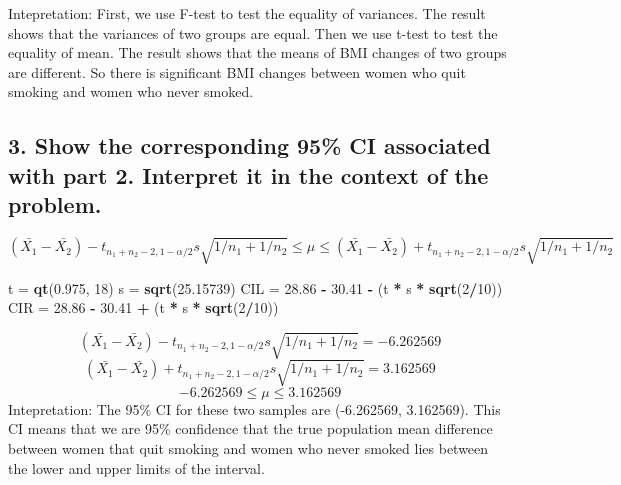 \documentclass[]{article}
\newenvironment{Shaded}{\begin{snugshade}}{\end{snugshade}}
\newcommand{\KeywordTok}[1]{\textcolor[rgb]{0.13,0.29,0.53}{\textbf{#1}}}
\newcommand{\DecValTok}[1]{\textcolor[rgb]{0.00,0.00,0.81}{#1}}
\newcommand{\FloatTok}[1]{\textcolor[rgb]{0.00,0.00,0.81}{#1}}
\newcommand{\StringTok}[1]{\textcolor[rgb]{0.31,0.60,0.02}{#1}}
\newcommand{\OperatorTok}[1]{\textcolor[rgb]{0.81,0.36,0.00}{\textbf{#1}}}
\newcommand{\NormalTok}[1]{#1}
\begin{document}
Intepretation: First, we use F-test to test the equality of variances.
The result shows that the variances of two groups are equal. Then we use
t-test to test the equality of mean. The result shows that the means of
BMI changes of two groups are different. So there is significant BMI
changes between women who quit smoking and women who never smoked.

\subsection{3. Show the corresponding 95\% CI associated with part 2.
Interpret it in the context of the
problem.}\label{show-the-corresponding-95-ci-associated-with-part-2.-interpret-it-in-the-context-of-the-problem.}

\[
(\bar{X_{1}}-\bar{X_{2}}) - t_{n_{1}+n_{2}-2, 1-\alpha /2}s\sqrt{1/n_{1}+1/n_{2}}\leq \mu\leq (\bar{X_{1}}-\bar{X_{2}}) + t_{n_{1}+n_{2}-2, 1-\alpha /2}s\sqrt{1/n_{1}+1/n_{2}}
\]

\begin{Shaded}
\begin{Highlighting}[]
\NormalTok{t =}\StringTok{ }\KeywordTok{qt}\NormalTok{(}\FloatTok{0.975}\NormalTok{, }\DecValTok{18}\NormalTok{)}
\NormalTok{s =}\StringTok{ }\KeywordTok{sqrt}\NormalTok{(}\FloatTok{25.15739}\NormalTok{)}
\NormalTok{CIL =}\StringTok{ }\FloatTok{28.86} \OperatorTok{-}\StringTok{ }\FloatTok{30.41} \OperatorTok{-}\StringTok{ }\NormalTok{(t }\OperatorTok{*}\StringTok{ }\NormalTok{s }\OperatorTok{*}\StringTok{ }\KeywordTok{sqrt}\NormalTok{(}\DecValTok{2}\OperatorTok{/}\DecValTok{10}\NormalTok{))}
\NormalTok{CIR =}\StringTok{ }\FloatTok{28.86} \OperatorTok{-}\StringTok{ }\FloatTok{30.41} \OperatorTok{+}\StringTok{ }\NormalTok{(t }\OperatorTok{*}\StringTok{ }\NormalTok{s }\OperatorTok{*}\StringTok{ }\KeywordTok{sqrt}\NormalTok{(}\DecValTok{2}\OperatorTok{/}\DecValTok{10}\NormalTok{))}
\end{Highlighting}
\end{Shaded}

\[
(\bar{X_{1}}-\bar{X_{2}}) - t_{n_{1}+n_{2}-2, 1-\alpha /2}s\sqrt{1/n_{1}+1/n_{2}} = 
-6.262569
\] \[
(\bar{X_{1}}-\bar{X_{2}}) + t_{n_{1}+n_{2}-2, 1-\alpha /2}s\sqrt{1/n_{1}+1/n_{2}} = 3.162569
\] \[
-6.262569 \leq \mu \leq 3.162569
\] Intepretation: The 95\% CI for these two samples are (-6.262569,
3.162569). This CI means that we are 95\% confidence that the true
population mean difference between women that quit smoking and women who
never smoked lies between the lower and upper limits of the interval.
\end{document}
